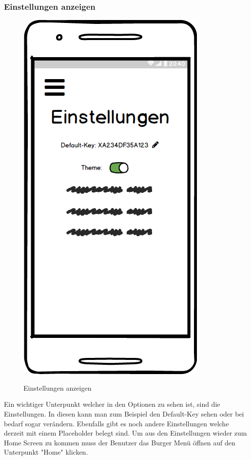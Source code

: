 \subsubsection{Einstellungen anzeigen}
\begin{figure}[H]
	\centering
	\includegraphics[width=.5\linewidth]{pictures/Mobile/Einstellungen.png}\
	\caption{Einstellungen anzeigen}
\end{figure}
Ein wichtiger Unterpunkt welcher in den Optionen zu sehen ist, sind die Einstellungen. In diesen kann man zum Beispiel den Default-Key sehen oder bei bedarf sogar verändern. Ebenfalls gibt es noch andere Einstellungen welche derzeit mit einem Placeholder belegt sind. Um aus den Einstellungen wieder zum Home Screen zu kommen muss der Benutzer das Burger Menü öffnen auf den Unterpunkt "Home" klicken.
